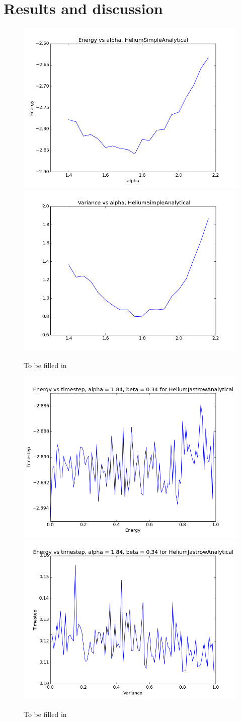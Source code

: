 \documentclass[11pt]{article}
\begin{document}
\section{Results and discussion}
	

	\begin{figure}
		\centering
		\includegraphics[width=0.45\linewidth]{figures/EnergyVsAlphaHeliumSimpleAnalytical}
		\includegraphics[width=0.45\linewidth]{figures/VarianceVsAlphaHeliumSimpleAnalytical}
		\caption{To be filled in}
		  \label{fig01:alpha_Simple}
	\end{figure}


	\begin{figure}
		\centering
		\includegraphics[width=0.45\linewidth]{figures/HeliumJastrowAnalyticalTimeEnergy}
		\includegraphics[width=0.45\linewidth]{figures/HeliumJastrowAnalyticalTimeVariance}
		\caption{To be filled in}
		  \label{fig02:timestep}
	\end{figure}
\end{document}
